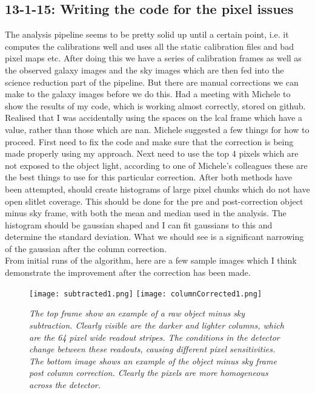 \documentclass{literature}
\begin{document}
\subsection{13-1-15: Writing the code for the pixel issues}
The analysis pipeline seems to be pretty solid up until a certain point, i.e. it computes the calibrations well and uses all the static calibration files and bad pixel maps etc. After doing this we have a series of calibration frames as well as the observed galaxy images and the sky images which are then fed into the science reduction part of the pipeline. But there are manual corrections we can make to the galaxy images before we do this. Had a meeting with Michele to show the results of my code, which is working almost correctly, stored on github. Realised that I was accidentally using the spaces on the lcal frame which have a value, rather than those which are nan. Michele suggested a few things for how to proceed. First need to fix the code and make sure that the correction is being made properly using my approach. Next need to use the top 4 pixels which are not exposed to the object light, according to one of Michele's colleagues these are the best things to use for this particular correction. After both methods have been attempted, should create histograms of large pixel chunks which do not have open slitlet coverage. This should be done for the pre and post-correction object minus sky frame, with both the mean and median used in the analysis. The histogram should be gaussian shaped and I can fit gaussians to this and determine the standard deviation. What we should see is a significant narrowing of the gaussian after the column correction. \\ 
From initial runs of the algorithm, here are a few sample images which I think demonstrate the improvement after the correction has been made. 



\begin{figure}[!htp]
\centering
\texttt{[image: subtracted1.png]}
\texttt{[image: columnCorrected1.png]}
\caption{\footnotesize{\emph{The top frame show an example of a raw object minus sky subtraction. Clearly visible are the darker and lighter columns, which are the 64 pixel wide readout stripes. The conditions in the detector change between these readouts, causing different pixel sensitivities. The bottom image shows an example of the object minus sky frame post column correction. Clearly the pixels are more homogeneous across the detector.}}}
\label{fig:col-corrected}
\end{figure}
\end{document}
